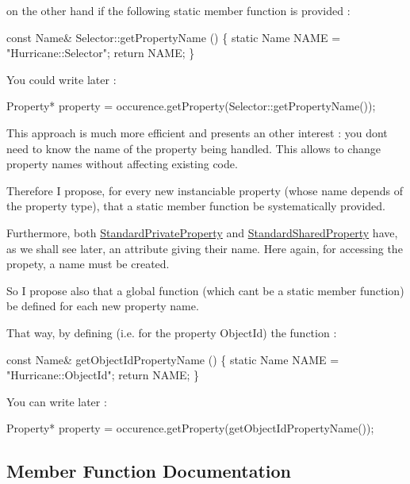 on the other hand if the following static member function is provided \+: 
\begin{DoxyCode}
\textcolor{keyword}{const} Name& Selector::getPropertyName ()
\{
  \textcolor{keyword}{static} Name NAME = \textcolor{stringliteral}{"Hurricane::Selector"};
  \textcolor{keywordflow}{return} NAME;
\}
\end{DoxyCode}
 You could write later \+: 
\begin{DoxyCode}
Property* \textcolor{keyword}{property} = occurence.getProperty(Selector::getPropertyName());
\end{DoxyCode}
 This approach is much more efficient and presents an other interest \+: you don\textquotesingle{}t need to know the name of the property being handled. This allows to change property names without affecting existing code.

Therefore I propose, for every new instanciable property (whose name depends of the property type), that a static member function be systematically provided.

Furthermore, both \hyperlink{classHurricane_1_1StandardPrivateProperty}{Standard\+Private\+Property} and \hyperlink{classHurricane_1_1StandardSharedProperty}{Standard\+Shared\+Property} have, as we shall see later, an attribute giving their name. Here again, for accessing the propety, a name must be created.

So I propose also that a global function (which can\textquotesingle{}t be a static member function) be defined for each new property name.

That way, by defining (i.\+e. for the property Object\+Id) the function \+: 
\begin{DoxyCode}
\textcolor{keyword}{const} Name& getObjectIdPropertyName ()
\{
  \textcolor{keyword}{static} Name NAME = \textcolor{stringliteral}{"Hurricane::ObjectId"};
  \textcolor{keywordflow}{return} NAME;
\}
\end{DoxyCode}
 You can write later \+: 
\begin{DoxyCode}
Property* \textcolor{keyword}{property} = occurence.getProperty(getObjectIdPropertyName());
\end{DoxyCode}
 

\subsection{Member Function Documentation}
\mbox{\label{classHurricane_1_1Property_ab60362699e6c6ea35ace45dbd1075a2f}} 
